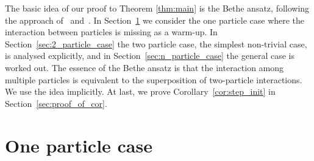 \documentclass[pdftex]{sigma}
\numberwithin{equation}{section}
\begin{document}
The basic idea of our proof to Theorem \ref{thm:main} is the Bethe ansatz, following the approach of~\cite{Tracy-Widom08} and~\cite{Korhonen-Lee14}. In Section~\ref{sec:1pt} we consider the one particle case where the interaction between particles is missing as a warm-up. In Section~\ref{sec:2_particle_case} the two particle case, the simplest non-trivial case, is analysed explicitly, and in Section~\ref{sec:n_particle_case} the general case is worked out. The essence of the Bethe ansatz is that the interaction among multiple particles is equivalent to the superposition of two-particle interactions. We use the idea implicitly. At last, we prove Corollary~\ref{cor:step_init} in Section~\ref{sec:proof_of_cor}.

\section{One particle case} \label{sec:1pt}
\end{document}

